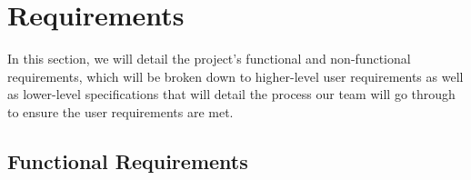 \chapter{Requirements}
\label{chap:requirements}

In this section, we will detail the project's functional and non-functional requirements, which will be broken down to higher-level user requirements as well as lower-level specifications that will detail the process our team will go through to ensure the user requirements are met.

    \section{Functional Requirements}
    \label{sec:func_requirements}

    \vspace{1em}
	
	\vspace{5em}

